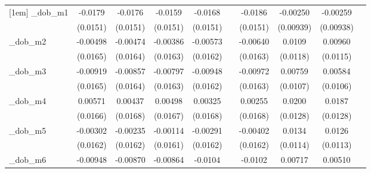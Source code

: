 \begin{table}[htbp]
\begin{tabular}{l*{9}{c}}
[1em]
\_dob\_m1     &     -0.0179         &     -0.0176         &     -0.0159         &     -0.0168         &                     &     -0.0186         &    -0.00250         &    -0.00259         &                     \\
            &    (0.0151)         &    (0.0151)         &    (0.0151)         &    (0.0151)         &                     &    (0.0151)         &   (0.00939)         &   (0.00938)         &                     \\
[1em]
\_dob\_m2     &    -0.00498         &    -0.00474         &    -0.00386         &    -0.00573         &                     &    -0.00640         &      0.0109         &     0.00960         &                     \\
            &    (0.0165)         &    (0.0164)         &    (0.0163)         &    (0.0162)         &                     &    (0.0163)         &    (0.0118)         &    (0.0115)         &                     \\
[1em]
\_dob\_m3     &    -0.00919         &    -0.00857         &    -0.00797         &    -0.00948         &                     &    -0.00972         &     0.00759         &     0.00584         &                     \\
            &    (0.0165)         &    (0.0164)         &    (0.0163)         &    (0.0162)         &                     &    (0.0163)         &    (0.0107)         &    (0.0106)         &                     \\
[1em]
\_dob\_m4     &     0.00571         &     0.00437         &     0.00498         &     0.00325         &                     &     0.00255         &      0.0200         &      0.0187         &                     \\
            &    (0.0166)         &    (0.0168)         &    (0.0167)         &    (0.0168)         &                     &    (0.0168)         &    (0.0128)         &    (0.0128)         &                     \\
[1em]
\_dob\_m5     &    -0.00302         &    -0.00235         &    -0.00114         &    -0.00291         &                     &    -0.00402         &      0.0134         &      0.0126         &                     \\
            &    (0.0162)         &    (0.0162)         &    (0.0161)         &    (0.0162)         &                     &    (0.0162)         &    (0.0114)         &    (0.0113)         &                     \\
[1em]
\_dob\_m6     &    -0.00948         &    -0.00870         &    -0.00864         &     -0.0104         &                     &     -0.0102         &     0.00717         &     0.00510         &                     \\

\end{tabular}
\end{table}
